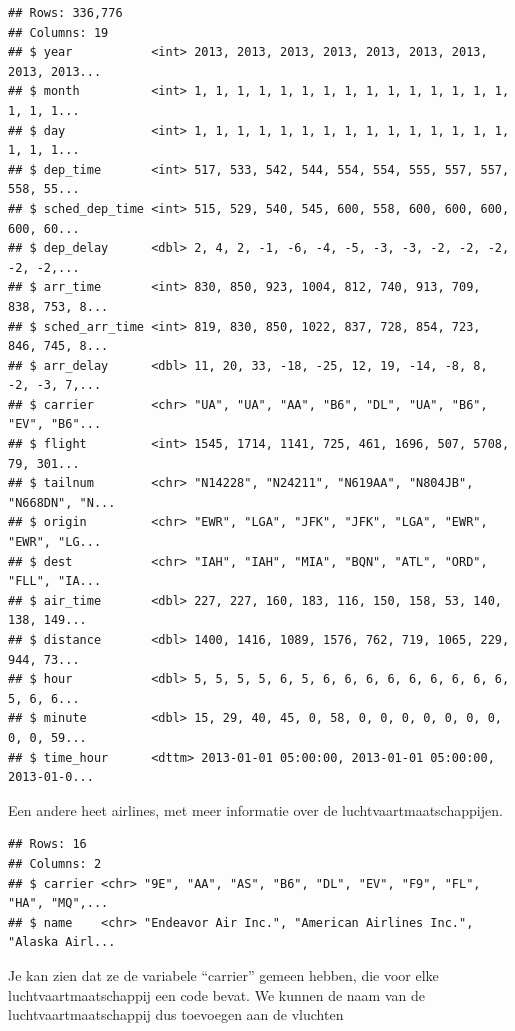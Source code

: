 \documentclass[]{tufte-book}
\newenvironment{Shaded}{}{}
\newcommand{\KeywordTok}[1]{\textcolor[rgb]{0.00,0.44,0.13}{\textbf{#1}}}
\newcommand{\NormalTok}[1]{#1}
\newcommand{\OperatorTok}[1]{\textcolor[rgb]{0.40,0.40,0.40}{#1}}
\newcommand{\StringTok}[1]{\textcolor[rgb]{0.25,0.44,0.63}{#1}}
\begin{document}
\begin{verbatim}
## Rows: 336,776
## Columns: 19
## $ year           <int> 2013, 2013, 2013, 2013, 2013, 2013, 2013, 2013, 2013...
## $ month          <int> 1, 1, 1, 1, 1, 1, 1, 1, 1, 1, 1, 1, 1, 1, 1, 1, 1, 1...
## $ day            <int> 1, 1, 1, 1, 1, 1, 1, 1, 1, 1, 1, 1, 1, 1, 1, 1, 1, 1...
## $ dep_time       <int> 517, 533, 542, 544, 554, 554, 555, 557, 557, 558, 55...
## $ sched_dep_time <int> 515, 529, 540, 545, 600, 558, 600, 600, 600, 600, 60...
## $ dep_delay      <dbl> 2, 4, 2, -1, -6, -4, -5, -3, -3, -2, -2, -2, -2, -2,...
## $ arr_time       <int> 830, 850, 923, 1004, 812, 740, 913, 709, 838, 753, 8...
## $ sched_arr_time <int> 819, 830, 850, 1022, 837, 728, 854, 723, 846, 745, 8...
## $ arr_delay      <dbl> 11, 20, 33, -18, -25, 12, 19, -14, -8, 8, -2, -3, 7,...
## $ carrier        <chr> "UA", "UA", "AA", "B6", "DL", "UA", "B6", "EV", "B6"...
## $ flight         <int> 1545, 1714, 1141, 725, 461, 1696, 507, 5708, 79, 301...
## $ tailnum        <chr> "N14228", "N24211", "N619AA", "N804JB", "N668DN", "N...
## $ origin         <chr> "EWR", "LGA", "JFK", "JFK", "LGA", "EWR", "EWR", "LG...
## $ dest           <chr> "IAH", "IAH", "MIA", "BQN", "ATL", "ORD", "FLL", "IA...
## $ air_time       <dbl> 227, 227, 160, 183, 116, 150, 158, 53, 140, 138, 149...
## $ distance       <dbl> 1400, 1416, 1089, 1576, 762, 719, 1065, 229, 944, 73...
## $ hour           <dbl> 5, 5, 5, 5, 6, 5, 6, 6, 6, 6, 6, 6, 6, 6, 6, 5, 6, 6...
## $ minute         <dbl> 15, 29, 40, 45, 0, 58, 0, 0, 0, 0, 0, 0, 0, 0, 0, 59...
## $ time_hour      <dttm> 2013-01-01 05:00:00, 2013-01-01 05:00:00, 2013-01-0...
\end{verbatim}

Een andere heet airlines, met meer informatie over de luchtvaartmaatschappijen.

\begin{Shaded}
\end{Shaded}

\begin{verbatim}
## Rows: 16
## Columns: 2
## $ carrier <chr> "9E", "AA", "AS", "B6", "DL", "EV", "F9", "FL", "HA", "MQ",...
## $ name    <chr> "Endeavor Air Inc.", "American Airlines Inc.", "Alaska Airl...
\end{verbatim}

Je kan zien dat ze de variabele ``carrier'' gemeen hebben, die voor elke luchtvaartmaatschappij een code bevat. We kunnen de naam van de luchtvaartmaatschappij dus toevoegen aan de vluchten
\end{document}
